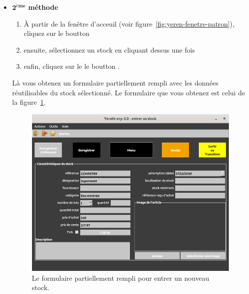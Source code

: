\begin{itemize}[]
	\item \textcolor{purplish}{$\mathbf{2^{\text{\`eme}}}$ \textbf{m\'ethode}}
		\begin{enumerate}[1)]
			\item \`A partir de la fen\^etre d'acceuil
			(voir figure~\ref{fig:yeren-fenetre-patron}),
			cliquez sur le boutton 
			\item ensuite, s\'electionnez un stock en cliquant dessus une fois
			\item enfin, cliquez sur le le boutton .\\
		\end{enumerate}				
		
		L\`a vous obtenez un formulaire partiellement rempli
	    avec les donn\'ees r\'eutilisables du stock s\'electionn\'e.
	    Le formulaire que vous obtenez est celui de la
	    figure~\ref{fig:formulaire-entrer-2}.\\
	    
	    \begin{figure}[!htbp]
		\centering
		\includegraphics[scale=0.63]{images/yeren-fenetre-entrer-2.png}
		\caption{Le formulaire partiellement rempli pour entrer un nouveau stock.}
		\label{fig:formulaire-entrer-2}
		\end{figure}
\end{itemize}

\newpage



